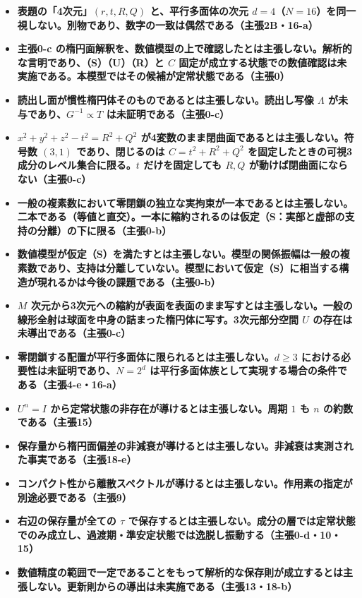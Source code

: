 \documentclass[
  10pt,
]{ltjsarticle}
\begin{document}
\begin{itemize}
\item
  \textbf{表題の「4次元」\((r,t,R,Q)\) と、平行多面体の次元
  \(d=4\)（\(N=16\)）を同一視しない。別物であり、数字の一致は偶然である（主張2B・16-a）}
\item
  \textbf{主張0-c
  の楕円面解釈を、数値模型の上で確認したとは主張しない。解析的な言明であり、（S）（U）（R）と
  \(C\)
  固定が成立する状態での数値確認は未実施である。本模型ではその候補が定常状態である（主張0）}
\item
  \textbf{読出し面が慣性楕円体そのものであるとは主張しない。読出し写像
  \(\Lambda\) が未与であり、\(G^{-1}\propto T\)
  は未証明である（主張0-c）}
\item
  \textbf{\(x^2+y^2+z^2-t^2=R^2+Q^2\)
  が4変数のまま閉曲面であるとは主張しない。符号数 \((3,1)\)
  であり、閉じるのは \(C = t^2+R^2+Q^2\)
  を固定したときの可視3成分のレベル集合に限る。\(t\) だけを固定しても
  \(R,Q\) が動けば閉曲面にならない（主張0-c）}
\item
  \textbf{一般の複素数において零閉鎖の独立な実拘束が一本であるとは主張しない。二本である（等値と直交）。一本に縮約されるのは仮定（S：実部と虚部の支持の分離）の下に限る（主張0-b）}
\item
  \textbf{数値模型が仮定（S）を満たすとは主張しない。模型の関係振幅は一般の複素数であり、支持は分離していない。模型において仮定（S）に相当する構造が現れるかは今後の課題である（主張0-b）}
\item
  \textbf{\(M\)
  次元から3次元への縮約が表面を表面のまま写すとは主張しない。一般の線形全射は球面を中身の詰まった楕円体に写す。3次元部分空間
  \(U\) の存在は未導出である（主張0-c）}
\item
  \textbf{零閉鎖する配置が平行多面体に限られるとは主張しない。\(d\ge3\)
  における必要性は未証明であり、\(N=2^d\)
  は平行多面体族として実現する場合の条件である（主張4-e・16-a）}
\item
  \textbf{\(U^n=I\) から定常状態の非存在が導けるとは主張しない。周期
  \(1\) も \(n\) の約数である（主張15）}
\item
  \textbf{保存量から楕円面偏差の非減衰が導けるとは主張しない。非減衰は実測された事実である（主張18-e）}
\item
  \textbf{コンパクト性から離散スペクトルが導けるとは主張しない。作用素の指定が別途必要である（主張9）}
\item
  \textbf{右辺の保存量が全ての \(\tau\)
  で保存するとは主張しない。成分の層では定常状態でのみ成立し、過渡期・準安定状態では逸脱し振動する（主張0-d・10・15）}
\item
  \textbf{数値精度の範囲で一定であることをもって解析的な保存則が成立するとは主張しない。更新則からの導出は未実施である（主張13・18-b）}

\end{itemize}
\end{document}

